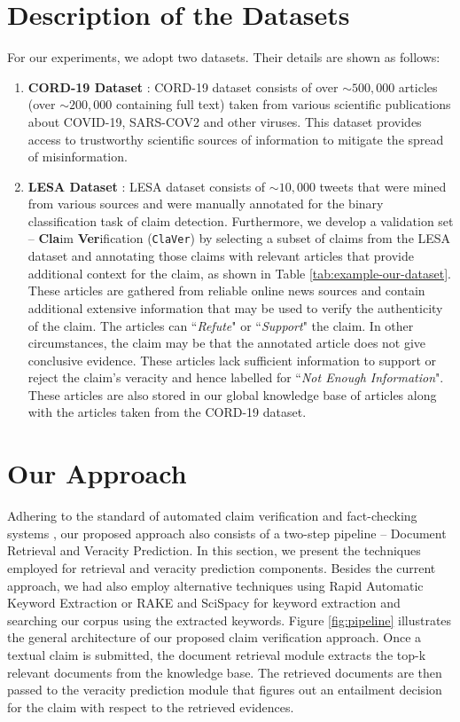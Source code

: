 \documentclass[11pt]{article}
\newcommand{\dataset}{\texttt{ClaVer}}
\begin{document}
\section{Description of the Datasets} 
For our experiments, we adopt two datasets. Their details are shown as follows:
\begin{enumerate}
    \item \textbf{CORD-19 Dataset} \cite{wang2020cord19}: CORD-19 dataset consists of over $\sim500,000$ articles (over $\sim200,000$ containing full text) taken from various scientific publications about COVID-19, SARS-COV2 and other viruses. This dataset provides access to trustworthy scientific sources of information to mitigate the spread of misinformation. %

    \item \textbf{LESA Dataset} \cite{gupta2021lesa}: LESA dataset consists of $\sim10,000$ tweets that were mined from various sources and were manually annotated for the binary classification task of claim detection. Furthermore, we develop a validation set -- \textbf{Cla}im \textbf{Ver}ification (\dataset) by selecting a subset of claims from the LESA dataset and annotating those claims with relevant articles that provide additional context for the claim, as shown in Table \ref{tab:example-our-dataset}. These articles are gathered from reliable online news sources and contain additional extensive information that may be used to verify the authenticity of the claim. The articles can ``\textit{Refute}" or ``\textit{Support}" the claim. In other circumstances, the claim may be that the annotated article does not give conclusive evidence. These articles lack sufficient information to support or reject the claim's veracity and hence labelled for ``\textit{Not Enough Information}". These articles are also stored in our global knowledge base of articles along with the articles taken from the CORD-19 dataset.
\end{enumerate}


\section{Our Approach}
Adhering to the standard of automated claim verification and fact-checking systems \cite{thorne-etal-2018-fact}, our proposed approach also consists of a two-step pipeline -- Document Retrieval and Veracity Prediction. In this section, we present the techniques employed for retrieval and veracity prediction components. Besides the current approach, we had also employ alternative techniques using Rapid Automatic Keyword Extraction or RAKE \cite{doi:https://doi.org/10.1002/9780470689646.ch1} and SciSpacy \cite{neumann-etal-2019-scispacy} for keyword extraction and searching our corpus using the extracted keywords. Figure \ref{fig:pipeline} illustrates the general architecture of our proposed claim verification approach. Once a textual claim is submitted, the document retrieval module extracts the top-k relevant documents from the knowledge base. The retrieved documents are then passed to the veracity prediction module that figures out an entailment decision for the claim with respect to the retrieved evidences. 
\end{document}
